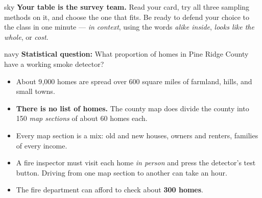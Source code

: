 \documentclass[12pt]{article}
\begin{document}

\boxguard[10]
\begin{headlinebox}{sky}
\small
\textbf{Your table is the survey team.} Read your card, try all three sampling methods on it,
and choose the one that fits. Be ready to defend your choice to the class in one minute ---
\emph{in context}, using the words \emph{alike inside}, \emph{looks like the whole}, or
\emph{cost}.
\end{headlinebox}

\vspace{0.08in}

\boxguard[12]
\begin{scenariobox}{navy}
\small
\textbf{Statistical question:} What proportion of homes in Pine Ridge County have a working
smoke detector?
\begin{itemize}[leftmargin=1.3em, itemsep=2pt, topsep=4pt]
  \item About 9{,}000 homes are spread over 600 square miles of farmland, hills, and small
        towns.
  \item \textbf{There is no list of homes.} The county map does divide the county into 150
        \emph{map sections} of about 60 homes each.
  \item Every map section is a mix: old and new houses, owners and renters, families of every
        income.
  \item A fire inspector must visit each home \emph{in person} and press the detector's test
        button. Driving from one map section to another can take an hour.
  \item The fire department can afford to check about \textbf{300 homes}.
\end{itemize}
\end{scenariobox}

\vspace{0.08in}
\end{document}
